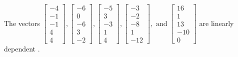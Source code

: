 \begin{exercise}
\begin{exerciseStatement}
  \end{exerciseStatement}
  \begin{exerciseAnswer}
   The vectors \(\left[\begin{array}{r}
-4 \\
-1 \\
-1 \\
4 \\
4
\end{array}\right] , \left[\begin{array}{r}
-6 \\
0 \\
-6 \\
3 \\
-2
\end{array}\right] , \left[\begin{array}{r}
-5 \\
3 \\
-3 \\
1 \\
4
\end{array}\right] , \left[\begin{array}{r}
-3 \\
-2 \\
-8 \\
1 \\
-12
\end{array}\right] , \text{ and } \left[\begin{array}{r}
16 \\
1 \\
13 \\
-10 \\
0
\end{array}\right]\) are 
  	 linearly dependent  .
  


  \end{exerciseAnswer}
\end{exercise}